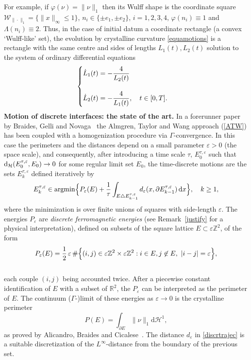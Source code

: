 \documentclass{interact}
\numberwithin{equation}{section}
\theoremstyle{definition}
\newcommand{\Z}{\mathbb{Z}}
\renewcommand{\H}{\mathcal{H}}
\renewcommand{\epsilon}{\varepsilon}
\def\e{\epsilon}
\begin{document}
For example, if $\varphi(\nu)=\|\nu\|_1$ then its Wulff shape is the coordinate square $\mathcal{W}_{\|\cdot\|_1}=\{\|x\|_{\infty}\leq1\}$, %
$n_i\in\{\pm e_1, \pm e_2\}$, $i=1,2,3,4$, $\varphi(n_i)\equiv1$ and $\Lambda(n_i)\equiv2$.
Thus, in the case of initial datum a coordinate rectangle (a convex `Wulff-like' set), the evolution by crystalline curvature \eqref{equamotions} is a rectangle with the same centre and sides of lengths $L_1(t), L_2(t)$ solution to the system of ordinary differential equations
\begin{equation}
\begin{cases}\displaystyle \dot L_1(t)= -{4\over L_2(t)}\cr\cr
\displaystyle \dot L_2(t)= -{4\over L_1(t)}, \quad t\in[0,T].\end{cases}
\label{crystarect}
\end{equation}
\noindent
{\bf Motion of discrete interfaces: the state of the art.} In a forerunner paper by Braides, Gelli and Novaga~\cite{BGN} the Almgren, Taylor and Wang approach (\ref{ATW}) has been coupled with a homogenization procedure via $\Gamma$-convergence. In this case the perimeters and the distances depend on a small parameter $\e>0$ (the space scale), and consequently, after introducing a time scale $\tau$, $E_0^{\tau,\epsilon}$ such that ${\rm d}_\mathcal{H}(E_0^{\tau,\epsilon},E_0)\to0$ for some regular limit set $E_0$, the time-discrete motions are the sets $E^{\tau,\e}_k$ defined iteratively by 
\begin{equation}
E^{\tau,\e}_k \in \text{argmin} \Bigl\{ P_\e(E)+{1\over \tau} \int_{E\triangle E_{k-1}^{\tau,\epsilon}} d_\epsilon(x,\partial E^{\tau,\e}_{k-1})\,\mathrm{d}x\Bigr\},\quad k\geq1,
\label{discrtrajec}
\end{equation}
where the minimization is over finite unions of squares with side-length $\varepsilon$.
The energies $P_\e$ are {\em discrete ferromagnetic energies} (see Remark~\ref{justify} for a physical interpretation), defined on subsets of the square lattice $E\subset \e\Z^2$, of the form
\begin{equation}
P_\e(E)= \frac{1}{2}\,\e\, \#\Bigl\{(i,j)\in\e\Z^2\times\e\Z^2: i\in E, j\not\in E, \ |i-j|=\e\Bigr\},
\label{ene}
\end{equation}
\\
each couple $(i,j)$ being accounted twice. After a piecewise constant identification of $E$ with a subset of $\mathbb{R}^2$, the $P_\varepsilon$ can be interpreted as the perimeter of $E$. The continuum ($\Gamma$\hbox{-})limit of these energies as $\epsilon\to0$ is the crystalline perimeter 
\begin{equation}
P(E)=\int_{\partial E}\|\nu\|_1\mathrm{d}\H^1,
\label{crysperimeter}
\end{equation}
as proved by Alicandro, Braides and Cicalese~\cite{ABC}. The distance $d_\epsilon$ in \eqref{discrtrajec} is a suitable discretization of the $L^\infty$-distance from the boundary of the previous set.
\end{document}
